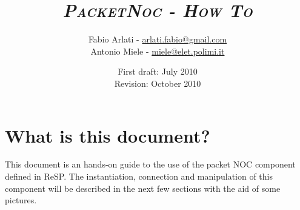 \documentclass[a4paper,11pt,oneside]{article}
\begin{document}
\hypersetup{bookmarksopen}			%
\fancyhead{}
\fancyfoot{}
\fancyhead[OR]{\slshape \leftmark}
\fancyhead[OL]{}
\fancyfoot[OC]{\thepage}
\pagestyle{fancy}				%

\title{\Huge \textit{\textsc{PacketNoc - How To}}}
\author{Fabio Arlati - \href{mailto:arlati.fabio@gmail.com}{arlati.fabio@gmail.com} \\ Antonio Miele - \href{mailto:miele@elet.polimi.it}{miele@elet.polimi.it}}
\date{First draft: July 2010\\ Revision: October 2010}
\maketitle					%

\tableofcontents

\section*{What is this document?}
This document is an hands-on guide to the use of the packet NOC component defined in ReSP. The instantiation, connection and manipulation of this component will be described in the next few sections with the aid of some pictures.
\end{document}
